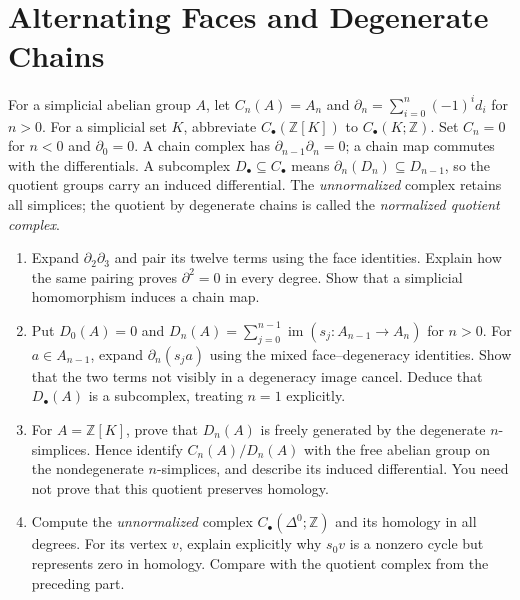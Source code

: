 \documentclass[11pt]{article}
\newcommand{\Z}{\mathbb Z}
\newcommand{\im}{\operatorname{im}}
\begin{document}
\section{Alternating Faces and Degenerate Chains}\label{ex:chains}
For a simplicial abelian group $A$, let $C_n(A)=A_n$ and
$\partial_n=\sum_{i=0}^n(-1)^i d_i$ for $n>0$.
For a simplicial set $K$, abbreviate $C_\bullet(\Z[K])$ to
$C_\bullet(K;\Z)$. Set $C_n=0$ for $n<0$ and $\partial_0=0$.
A chain complex has $\partial_{n-1}\partial_n=0$; a chain map commutes
with the differentials. A subcomplex $D_\bullet\subseteq C_\bullet$
means $\partial_n(D_n)\subseteq D_{n-1}$, so the quotient groups carry
an induced differential. The \emph{unnormalized} complex retains all
simplices; the quotient by degenerate chains is called the
\emph{normalized quotient complex}.
\begin{enumerate}
\item Expand $\partial_2\partial_3$ and pair its twelve terms using the
face identities. Explain how the same pairing proves $\partial^2=0$
in every degree. Show that a simplicial homomorphism induces a chain map.
\item Put $D_0(A)=0$ and
$D_n(A)=\sum_{j=0}^{n-1}\im(s_j:A_{n-1}\to A_n)$ for $n>0$.
For $a\in A_{n-1}$, expand $\partial_n(s_ja)$ using the mixed
face--degeneracy identities. Show that the two terms not visibly
in a degeneracy image cancel. Deduce that $D_\bullet(A)$ is a
subcomplex, treating $n=1$ explicitly.
\item For $A=\Z[K]$, prove that $D_n(A)$ is freely generated by the
degenerate $n$-simplices. Hence identify $C_n(A)/D_n(A)$ with the free
abelian group on the nondegenerate $n$-simplices, and describe its
induced differential. You need not prove that this quotient preserves
homology.
\item Compute the \emph{unnormalized} complex $C_\bullet(\Delta^0;\Z)$
and its homology in all degrees. For its vertex $v$, explain explicitly
why $ s_0v$ is a nonzero cycle but represents zero in
homology. Compare with the quotient complex from the preceding part.
\end{enumerate}
\end{document}
